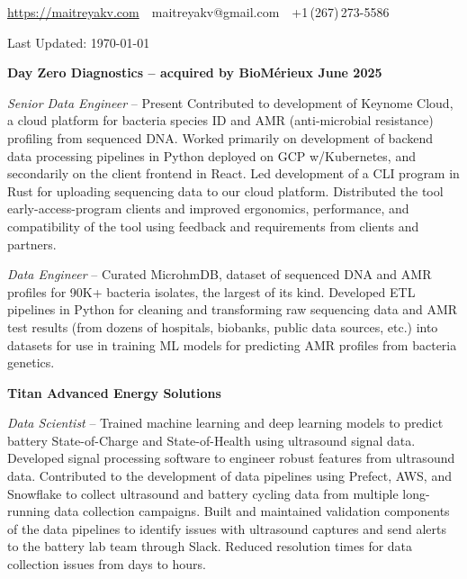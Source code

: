 \documentclass[letterpaper,MMMyyyy,nonstopmode]{simpleresumecv}
\newcommand{\CVAuthor}{Maitreya Venkataswamy}
\newcommand{\CVWebpage}{}
\begin{document}
\Title{\CVAuthor}

\begin{SubTitle}
\url{https://maitreyakv.com}
\,\SubBulletSymbol\,
maitreyakv@gmail.com
\,\SubBulletSymbol\,
+1\,(267)\,273-5586
\href{\CVWebpage}
{\url{\CVWebpage}}
\par
\par
Last Updated: \today
\end{SubTitle}

\begin{Body}


\Entry \textbf{Day Zero Diagnostics -- acquired by BioM\'erieux June 2025}

\Gap

\BulletItem \textit{Senior Data Engineer}
\hfill
{} -- Present
\SubBulletItem
  Contributed to development of Keynome Cloud, a cloud platform for bacteria species ID and AMR (anti-microbial resistance) profiling from sequenced DNA. Worked primarily on development of backend data processing pipelines in Python deployed on GCP w/Kubernetes, and secondarily on the client frontend in React.
\SubBulletItem
Led development of a CLI program in Rust for uploading sequencing data to our cloud platform. Distributed the tool early-access-program clients and improved ergonomics, performance, and compatibility of the tool using feedback and requirements from clients and partners. 

\Gap

\BulletItem \textit{Data Engineer}
\hfill
{} -- 
\SubBulletItem
Curated MicrohmDB, dataset of sequenced DNA and AMR profiles for 90K+ bacteria isolates, the largest of its kind. Developed ETL pipelines in Python for cleaning and transforming raw sequencing data and AMR test results (from dozens of hospitals, biobanks, public data sources, etc.) into datasets for use in training ML models for predicting AMR profiles from bacteria genetics.

\BigGap

\Entry \textbf{Titan Advanced Energy Solutions}

\Gap

\BulletItem \textit{Data Scientist}
\hfill
{} -- 
\SubBulletItem
Trained machine learning and deep learning models to predict battery State-of-Charge and State-of-Health using ultrasound signal data. Developed signal processing software to engineer robust features from ultrasound data.
\SubBulletItem
Contributed to the development of data pipelines using Prefect, AWS, and Snowflake to collect ultrasound and battery cycling data from multiple long-running data collection campaigns.
\SubBulletItem
Built and maintained validation components of the data pipelines to identify issues with ultrasound captures and send alerts to the battery lab team through Slack. Reduced resolution times for data collection issues from days to hours.


\end{Body}
\end{document}
